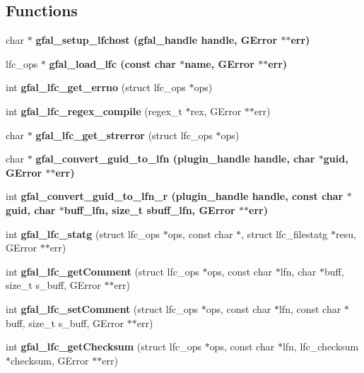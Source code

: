 \subsection*{Functions}
\begin{CompactItemize}
\item 
char $\ast$ \bf{gfal\_\-setup\_\-lfchost} (gfal\_\-handle handle, GError $\ast$$\ast$err)
\item 
lfc\_\-ops $\ast$ \bf{gfal\_\-load\_\-lfc} (const char $\ast$name, GError $\ast$$\ast$err)
\item 
int \textbf{gfal\_\-lfc\_\-get\_\-errno} (struct lfc\_\-ops $\ast$ops)\label{lfc__ifce__ng_8h_caa53981228e722b2175cfd7b4ca051c}

\item 
int \textbf{gfal\_\-lfc\_\-regex\_\-compile} (regex\_\-t $\ast$rex, GError $\ast$$\ast$err)\label{lfc__ifce__ng_8h_4ecadc4bf36b4b23af7beb949f6190be}

\item 
char $\ast$ \textbf{gfal\_\-lfc\_\-get\_\-strerror} (struct lfc\_\-ops $\ast$ops)\label{lfc__ifce__ng_8h_58172b62403dfd7a7b742548f074cd44}

\item 
char $\ast$ \bf{gfal\_\-convert\_\-guid\_\-to\_\-lfn} (plugin\_\-handle handle, char $\ast$guid, GError $\ast$$\ast$err)
\item 
int \bf{gfal\_\-convert\_\-guid\_\-to\_\-lfn\_\-r} (plugin\_\-handle handle, const char $\ast$guid, char $\ast$buff\_\-lfn, size\_\-t sbuff\_\-lfn, GError $\ast$$\ast$err)
\item 
int \textbf{gfal\_\-lfc\_\-statg} (struct lfc\_\-ops $\ast$ops, const char $\ast$, struct lfc\_\-filestatg $\ast$resu, GError $\ast$$\ast$err)\label{lfc__ifce__ng_8h_afccde3c16147263025698f5481635cf}

\item 
int \textbf{gfal\_\-lfc\_\-get\-Comment} (struct lfc\_\-ops $\ast$ops, const char $\ast$lfn, char $\ast$buff, size\_\-t s\_\-buff, GError $\ast$$\ast$err)\label{lfc__ifce__ng_8h_71ac937c7262a53247ea1b204ae23c6c}

\item 
int \textbf{gfal\_\-lfc\_\-set\-Comment} (struct lfc\_\-ops $\ast$ops, const char $\ast$lfn, const char $\ast$buff, size\_\-t s\_\-buff, GError $\ast$$\ast$err)\label{lfc__ifce__ng_8h_0b9952562acf59969aefc9519956f877}

\item 
int \textbf{gfal\_\-lfc\_\-get\-Checksum} (struct lfc\_\-ops $\ast$ops, const char $\ast$lfn, lfc\_\-checksum $\ast$checksum, GError $\ast$$\ast$err)\label{lfc__ifce__ng_8h_3285a6a2cf6d76aa8fadabaee79f7896}


\end{CompactItemize}
